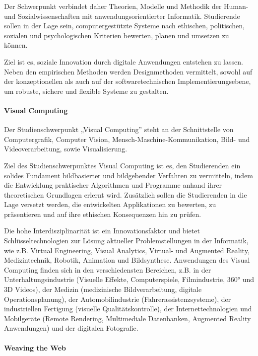 Der Schwerpunkt verbindet daher Theorien, Modelle und Methodik der
Human- und Sozialwissenschaften mit anwendungsorientierter Informatik.
Studierende sollen in der Lage sein, computergestützte Systeme nach
ethischen, politischen, sozialen und psychologischen Kriterien bewerten,
planen und umsetzen zu können.

Ziel ist es, soziale Innovation durch digitale Anwendungen entstehen zu
lassen. Neben den empirischen Methoden werden Designmethoden vermittelt,
sowohl auf der konzeptionellen als auch auf der softwaretechnischen
Implementierungsebene, um robuste, sichere und flexible Systeme zu
gestalten.

\paragraph{Visual Computing}\label{visual-computing}

Der Studienschwerpunkt „Visual Computing'' steht an der Schnittstelle
von Computergrafik, Computer Vision, Mensch-Maschine-Kommunikation,
Bild- und Videoverarbeitung, sowie Visualisierung.

Ziel des Studienschwerpunktes Visual Computing ist es, den Studierenden
ein solides Fundament bildbasierter und bildgebender Verfahren zu
vermitteln, indem die Entwicklung praktischer Algorithmen und Programme
anhand ihrer theoretischen Grundlagen erlernt wird. Zusätzlich sollen
die Studierenden in die Lage versetzt werden, die entwickelten
Applikationen zu bewerten, zu präsentieren und auf ihre ethischen
Konsequenzen hin zu prüfen.

Die hohe Interdisziplinarität ist ein Innovationsfaktor und bietet
Schlüsseltechnologien zur Lösung aktueller Problemstellungen in der
Informatik, wie z.B. Virtual Engineering, Visual Analytics, Virtual- und
Augmented Reality, Medizintechnik, Robotik, Animation und Bildsynthese.
Anwendungen des Visual Computing finden sich in den verschiedensten
Bereichen, z.B. in der Unterhaltungsindustrie (Visuelle Effekte,
Computerspiele, Filmindustrie, 360° und 3D Videos), der Medizin
(medizinische Bildverarbeitung, digitale Operationsplanung), der
Automobilindustrie (Fahrerassistenzsysteme), der industriellen Fertigung
(visuelle Qualitätskontrolle), der Internettechnologien und Mobilgeräte
(Remote Rendering, Multimediale Datenbanken, Augmented Reality
Anwendungen) und der digitalen Fotografie.

\paragraph{Weaving the Web}\label{weaving-the-web}

